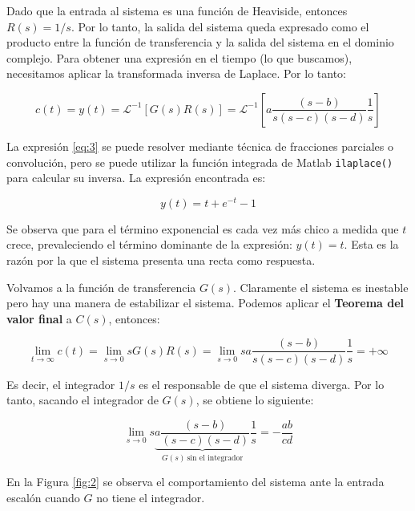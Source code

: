 \noindent Dado que la entrada al sistema es una función de Heaviside, entonces $R(s) = 1/s$. Por lo tanto, la salida del sistema queda expresado como el producto entre la función de transferencia y la salida del sistema en el dominio complejo. Para obtener una expresión en el tiempo (lo que buscamos), necesitamos aplicar la transformada inversa de Laplace. Por lo tanto:

\begin{equation}
    \label{eq:3}
    c(t) = y(t) = \mathcal{L}^{-1} [G(s)R(s)] = \mathcal{L}^{-1} \left[a\frac{(s - b)}{s(s-c)(s-d)} \frac{1}{s}\right] 
\end{equation}



La expresión \ref{eq:3} se puede resolver mediante técnica de fracciones parciales o convolución, pero se puede utilizar la función integrada de Matlab \texttt{ilaplace()} para calcular su inversa. La expresión encontrada es:

\begin{equation}
    y(t) = t + e^{-t} - 1
\end{equation}


\noindent Se observa que para el término exponencial es cada vez más chico a medida que $t$ crece, prevaleciendo el término dominante de la expresión: $y(t) = t$. Esta es la razón por la que el sistema presenta una recta como respuesta.


Volvamos a la función de transferencia $G(s)$. Claramente el sistema es inestable pero hay una manera de estabilizar el sistema. Podemos aplicar el \textbf{Teorema del valor final} a $C(s)$, entonces:

\begin{equation}
    \lim_{t \to \infty} c(t) = \lim_{s \to 0} sG(s)R(s) = \lim_{s \to 0} s a\frac{(s - b)}{s(s-c)(s-d)} \frac{1}{s} = +\infty
\end{equation}


\noindent Es decir, el integrador $1/s$ es el responsable de que el sistema diverga. Por lo tanto, sacando el integrador de $G(s)$, se obtiene lo siguiente:

\begin{equation}
    \label{eq:6}
    \lim_{s \to 0} s \underbrace{a\frac{(s - b)}{(s-c)(s-d)}}_{G(s) \ \text{sin el integrador}} \frac{1}{s} = -\frac{ab}{cd}
\end{equation}


En la Figura \ref{fig:2} se observa el comportamiento del sistema ante la entrada escalón cuando $G$ no tiene el integrador.

